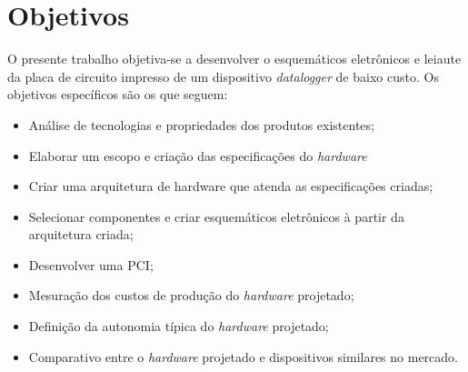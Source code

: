 



\section{Objetivos}

O presente trabalho objetiva-se a desenvolver o esquemáticos eletrônicos e leiaute da placa de circuito impresso de um dispositivo \textit{datalogger} de baixo custo. Os objetivos específicos são os que seguem:

\begin{itemize}
    \item Análise de tecnologias e propriedades dos produtos existentes;
    \item Elaborar um escopo e criação das especificações do \textit{hardware}
    \item Criar uma arquitetura de hardware que atenda as especificações criadas;
    \item Selecionar componentes e criar esquemáticos eletrônicos à partir da arquitetura criada;
    \item Desenvolver uma \gls{PCI};
    \item Mesuração dos custos de produção do \textit{hardware} projetado;
    \item Definição da autonomia típica do \textit{hardware} projetado;
    \item Comparativo entre o \textit{hardware} projetado e dispositivos similares no mercado.
    
\end{itemize}


